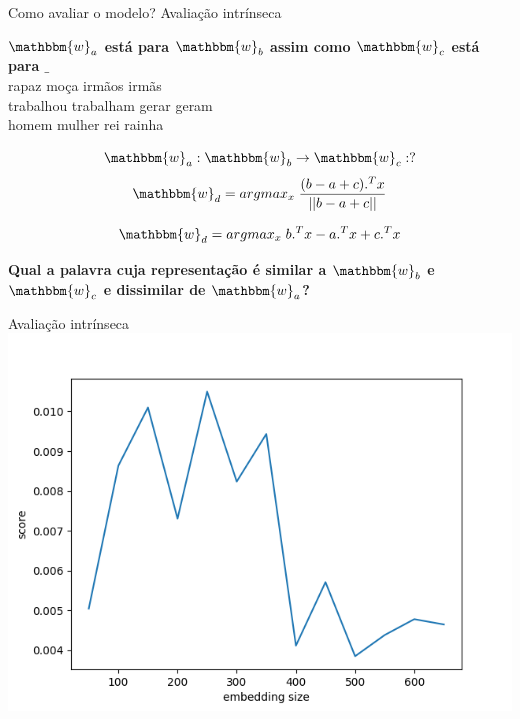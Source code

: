\documentclass{beamer}
\newcommand{\wo}{\mathbbm{w}}
\begin{document}
\begin{frame}[fragile]{Como avaliar o modelo? Avaliação intrínseca}
\begin{center}
\textbf{$\wo_{a}$ está para $\wo_{b}$ assim como $\wo_{c}$ está para $\_$}\\
rapaz moça irmãos irmãs\\
trabalhou trabalham gerar geram\\
homem mulher rei rainha
\end{center}
\[
\wo_{a}:\wo_{b} \rightarrow \wo_{c}: ?
\]
\begin{equation}\label{eq:32}
\wo_{d} = arg max_{x} \; \frac{(b-a +c).^{T}x}{||b-a +c||}
\end{equation}

\begin{equation}\label{eq:33}
\wo_{d} = arg max_{x}  \; b.^{T}x -a.^{T}x +c.^{T}x
\end{equation}
\begin{center}
\textbf{ Qual a palavra cuja representação é similar a $\wo_{b}$ e $\wo_{c}$ e dissimilar de $\wo_{a}$?}
\end{center}

\end{frame}

\begin{frame}[fragile]{Avaliação intrínseca}
\includegraphics[scale=0.69]{emb_size}
\end{frame}
\end{document}
